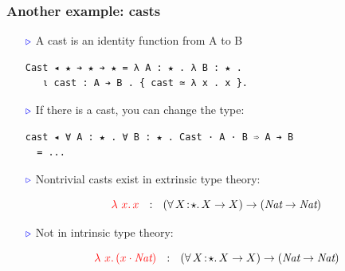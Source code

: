 \documentclass[11pt]{beamer}
\newcommand{\abs}[4]{{#1}\, #2\! : \! #3.\, #4}
\newcommand{\myb}[0]{\ensuremath{\textcolor{blue}{\triangleright}}}
\begin{document}
\begin{frame}[containsverbatim]
  \frametitle{Another example: casts}

  \begin{itemize}
  \item[$\myb$] A cast is an identity function from A to B

{\small
\begin{verbatim}
Cast ◂ ★ ➔ ★ ➔ ★ = λ A : ★ . λ B : ★ .
   ι cast : A ➔ B . { cast ≃ λ x . x }.
\end{verbatim}
}

\item[$\myb$] If there is a cast, you can change the type:

{\small
\begin{verbatim}
cast ◂ ∀ A : ★ . ∀ B : ★ . Cast · A · B ➾ A ➔ B 
  = ...
\end{verbatim}
}

\item[$\myb$] Nontrivial casts exist in extrinsic type theory:

\vspace{-.2cm}

\[ {\color{red}\lambda\ x.\,x} \ \ : \ \ (\abs{\forall}{X}{\star}{X\to X}) \to (\textit{Nat} \to \textit{Nat}) \]

\item[$\myb$] Not in intrinsic type theory:

\vspace{-.2cm}

\[ {\color{red}\lambda\ x.\,(x \cdot \textit{Nat})} \ \ : \ \ (\abs{\forall}{X}{\star}{X\to X}) \to (\textit{Nat} \to \textit{Nat}) \]

  \end{itemize}

  \end{frame}
\end{document}
